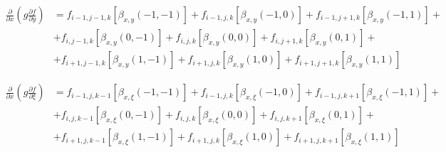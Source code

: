 \begin{equation*}
    \begin{split}
        \frac
            {\partial}
            {\partial x}
        \left(
            g
            \frac
                {\partial f}
                {\partial y}
        \right)
        &
        =
        f_{i-1, j-1, k}
        \left[
            \beta_{x,y} \left(-1, -1\right)
        \right]
        +
        f_{i-1, j, k}
        \left[
            \beta_{x,y} \left(-1, 0\right)
        \right]
        +
        f_{i-1, j+1, k}
        \left[
            \beta_{x,y} \left(-1, 1\right)
        \right]
        +
        \\
        &
        +
        f_{i, j-1, k}
        \left[
            \beta_{x,y} \left(0,-1\right)
        \right]
        +
        f_{i, j, k}
        \left[
            \beta_{x,y} \left(0,0\right)
        \right]
        +
        f_{i, j+1, k}
        \left[
            \beta_{x,y} \left(0, 1\right)
        \right]
        +
        \\
        &
        +
        f_{i+1, j-1, k}
        \left[
            \beta_{x,y} \left(1, -1\right)
        \right]
        +
        f_{i+1, j, k}
        \left[
            \beta_{x,y} \left(1, 0\right)
        \right]
        +
        f_{i+1, j+1, k}
        \left[
            \beta_{x,y} \left(1, 1\right)
        \right]
    \end{split}
\end{equation*}

\begin{equation*}
    \begin{split}
        \frac
            {\partial}
            {\partial x}
        \left(
            g
            \frac
                {\partial f}
                {\partial \xi}
        \right)
        &
        =
        f_{i-1, j, k-1}
        \left[
            \beta_{x, \xi} \left(-1, -1\right)
        \right]
        +
        f_{i-1, j, k}
        \left[
            \beta_{x, \xi} \left(-1, 0\right)
        \right]
        +
        f_{i-1, j, k+1}
        \left[
            \beta_{x, \xi} \left(-1, 1\right)
        \right]
        +
        \\
        &
        +
        f_{i, j, k-1}
        \left[
            \beta_{x, \xi} \left(0,-1\right)
        \right]
        +
        f_{i, j, k}
        \left[
            \beta_{x, \xi} \left(0,0\right)
        \right]
        +
        f_{i, j, k+1}
        \left[
            \beta_{x, \xi} \left(0, 1\right)
        \right]
        +
        \\
        &
        +
        f_{i+1, j, k-1}
        \left[
            \beta_{x, \xi} \left(1, -1\right)
        \right]
        +
        f_{i+1, j, k}
        \left[
            \beta_{x, \xi} \left(1, 0\right)
        \right]
        +
        f_{i+1, j, k+1}
        \left[
            \beta_{x, \xi} \left(1, 1\right)
        \right]
    \end{split}
\end{equation*}

